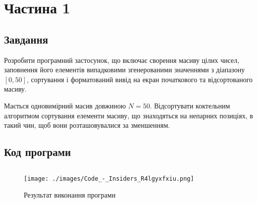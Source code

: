 \section{Частина 1}
\label{sec:task1}

\subsection{Завдання}
\label{subsec:task1_task}

Розробити програмний застосунок, що включає сворення масиву
цілих чисел, заповнення його елементів випадковими
згенерованими значеннями з діапазону $[0, 50]$,
сортування і форматований вивід на екран початкового та
відсортованого масиву.

Мається одновимірний масив довжиною $N = 50$.
Відсортувати коктельним алгоритмом сортування
елементи масиву, що знаходяться на непарних позиціях,
в такий чин, щоб вони розташовувалися за зменшенням.

\subsection{Код програми}
\label{subsec:task1_code}
\inputminted{cpp}{../src/task1.cpp}

\begin{figure}[!ht]
    \centering
    \texttt{[image: ./images/Code\_-\_Insiders\_R4lgyxfxiu.png]}
    \caption{Результат виконання програми}
    \label{fig:task1_exec}
\end{figure}
